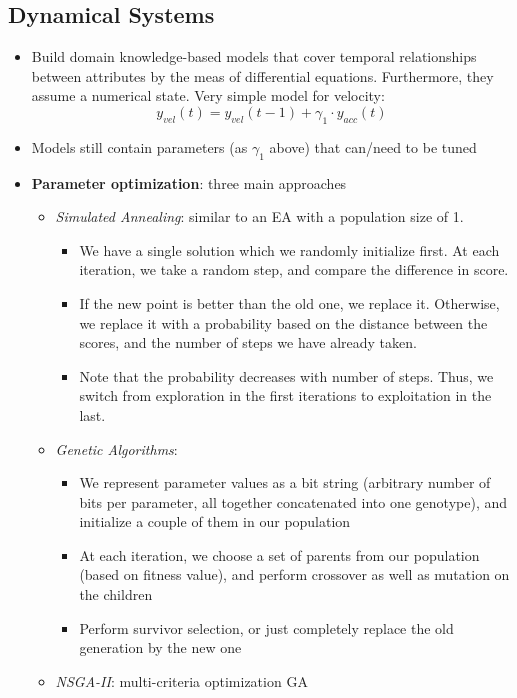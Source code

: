 \subsection{Dynamical Systems}
\begin{itemize}
	\item Build domain knowledge-based models that cover temporal relationships between attributes by the meas of differential equations. Furthermore, they assume a numerical state. Very simple model for velocity:
	$$y_{vel}(t) = y_{vel}(t-1) + \gamma_1 \cdot y_{acc}(t)$$
	\item Models still contain parameters (as $\gamma_1$ above) that can/need to be tuned
	\item \textbf{Parameter optimization}: three main approaches
	\begin{itemize}
		\item \textit{Simulated Annealing}: similar to an EA with a population size of 1. 
		\begin{itemize}
			\item We have a single solution which we randomly initialize first. At each iteration, we take a random step, and compare the difference in score. 
			\item If the new point is better than the old one, we replace it. Otherwise, we replace it with a probability based on the distance between the scores, and the number of steps we have already taken. 
			\item Note that the probability decreases with number of steps. Thus, we switch from exploration in the first iterations to exploitation in the last.
		\end{itemize}
		\item \textit{Genetic Algorithms}: 
		\begin{itemize}
			\item We represent parameter values as a bit string (arbitrary number of bits per parameter, all together concatenated into one genotype), and initialize a couple of them in our population 
			\item At each iteration, we choose a set of parents from our population (based on fitness value), and perform crossover as well as mutation on the children
			\item Perform survivor selection, or just completely replace the old generation by the new one
		\end{itemize}
		\item \textit{NSGA-II}: multi-criteria optimization GA
		\begin{itemize}

\end{itemize}
\end{itemize}
\end{itemize}
